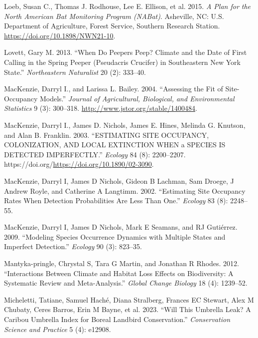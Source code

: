 \documentclass[
  letterpaper,
  DIV=11,
  numbers=noendperiod,
  oneside]{scrartcl}
\newlength{\cslhangindent}
\newenvironment{CSLReferences}[2] %
 {\begin{list}{}{%
  \setlength{\itemindent}{0pt}
  \setlength{\leftmargin}{0pt}
  \setlength{\parsep}{0pt}
  \ifodd #1
   \setlength{\leftmargin}{\cslhangindent}
   \setlength{\itemindent}{-1\cslhangindent}
  \fi
  \setlength{\itemsep}{#2\baselineskip}}}
 {\end{list}}
\begin{document}
\begin{CSLReferences}{1}{0}
Loeb, Susan C., Thomas J. Rodhouse, Lee E. Ellison, et al. 2015. \emph{A
Plan for the North American Bat Monitoring Program (NABat)}. Asheville,
NC: U.S. Department of Agriculture, Forest Service, Southern Research
Station. \url{https://doi.org/10.1898/NWN21-10}.

Lovett, Gary M. 2013. {``When Do Peepers Peep? Climate and the Date of
First Calling in the Spring Peeper (Pseudacris Crucifer) in Southeastern
New York State.''} \emph{Northeastern Naturalist} 20 (2): 333--40.

MacKenzie, Darryl I., and Larissa L. Bailey. 2004. {``Assessing the Fit
of Site-Occupancy Models.''} \emph{Journal of Agricultural, Biological,
and Environmental Statistics} 9 (3): 300--318.
\url{http://www.jstor.org/stable/1400484}.

MacKenzie, Darryl I., James D. Nichols, James E. Hines, Melinda G.
Knutson, and Alan B. Franklin. 2003. {``ESTIMATING SITE OCCUPANCY,
COLONIZATION, AND LOCAL EXTINCTION WHEN a SPECIES IS DETECTED
IMPERFECTLY.''} \emph{Ecology} 84 (8): 2200--2207.
https://doi.org/\url{https://doi.org/10.1890/02-3090}.

MacKenzie, Darryl I, James D Nichols, Gideon B Lachman, Sam Droege, J
Andrew Royle, and Catherine A Langtimm. 2002. {``Estimating Site
Occupancy Rates When Detection Probabilities Are Less Than One.''}
\emph{Ecology} 83 (8): 2248--55.

MacKenzie, Darryl I, James D Nichols, Mark E Seamans, and RJ Gutiérrez.
2009. {``Modeling Species Occurrence Dynamics with Multiple States and
Imperfect Detection.''} \emph{Ecology} 90 (3): 823--35.

Mantyka-pringle, Chrystal S, Tara G Martin, and Jonathan R Rhodes. 2012.
{``Interactions Between Climate and Habitat Loss Effects on
Biodiversity: A Systematic Review and Meta-Analysis.''} \emph{Global
Change Biology} 18 (4): 1239--52.

Micheletti, Tatiane, Samuel Haché, Diana Stralberg, Frances EC Stewart,
Alex M Chubaty, Ceres Barros, Erin M Bayne, et al. 2023. {``Will This
Umbrella Leak? A Caribou Umbrella Index for Boreal Landbird
Conservation.''} \emph{Conservation Science and Practice} 5 (4): e12908.


\end{CSLReferences}
\end{document}

